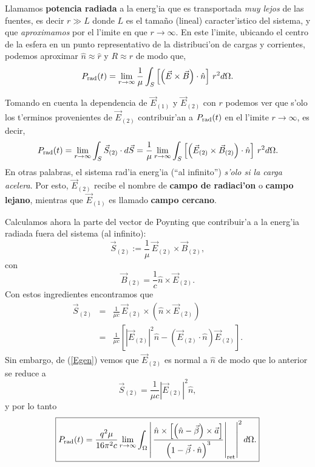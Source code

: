 Llamamos \textbf{potencia radiada} a la energ'ia que es transportada \textit{muy lejos} de las fuentes, es decir $r\gg L$ donde $L$ es el tamaño (lineal) caracter'istico del sistema, y que \textit{aproximamos} por el l'imite en que $r\rightarrow\infty$. En este l'imite, ubicando el centro de la esfera en un punto representativo de la distribuci'on de cargas y corrientes, podemos aproximar $\hat{n}\approx\hat{r}$ y $R\approx r$ de modo que,
\begin{equation}
P_{\rm rad} (t)=\lim_{r\rightarrow\infty}\frac{1}{\mu}\int_S \left[ \left(
\vec{E}\times\vec{B}\right) \cdot \hat{n}\right] \,r^2 d\Omega.
\end{equation}

Tomando en cuenta la dependencia de $\vec{E}_{(1)}$ y $\vec{E}_{(2)}$ con $r$
podemos ver que s'olo los t'erminos provenientes de $\vec{E}_{(2)}$
contribuir'an a $P_{\rm rad}(t)$ en el l'imite $r\rightarrow\infty$, es decir,
\begin{equation}\label{Pinf1}
P_{\rm rad}(t)=\lim_{r\rightarrow\infty}\int_S \vec{S}_{(2)}\cdot
d\vec{S}=\frac{1}{\mu}\lim_{r\rightarrow\infty}\int_S \left[ \left(
\vec{E}_{(2)}\times\vec{B}_{(2)}\right) \cdot \hat{n}\right] \,r^2 d\Omega.
\end{equation}
En otras palabras, el sistema rad'ia energ'ia (``al infinito'') \textit{s'olo si la
carga acelera}. Por esto, $\vec{E}_{(2)}$ recibe el nombre de \textbf{campo de
radiaci'on} o \textbf{campo lejano}, mientras que $\vec{E}_{(1)}$ es llamado
\textbf{campo cercano}.

Calculamos ahora la parte del vector de Poynting que contribuir'a a la energ'ia
radiada fuera del sistema (al infinito):
\begin{equation}
 \vec{S}_{(2)}:=\frac{1}{\mu}\, \vec{E}_{(2)}\times\vec{B}_{(2)},
\end{equation}
con
\begin{equation}
\vec{B}_{(2)}= \frac{1}{c}\hat{n}\times\vec{E}_{(2)}.
\end{equation}
Con estos ingredientes encontramos que
\begin{eqnarray}
 \vec{S}_{(2)}&=&\frac{1}{\mu c}\, \vec{E}_{(2)}\times\left(
\hat{n}\times\vec{E}_{(2)}\right) \\
 &=& \frac{1}{\mu c}\left[ \left|\vec{E}_{(2)}\right|^2 \hat{n}-\left(
\vec{E}_{(2)}\cdot\hat{n}\right)  \vec{E}_{(2)}\right].
\end{eqnarray}
Sin embargo, de (\ref{Egen}) vemos que $\vec{E}_{(2)}$ es normal a $\hat{n}$ de
modo que lo anterior se reduce a
\begin{equation}\label{S2E}
 \boxed{\vec{S}_{(2)}= \frac{1}{\mu c} \left|\vec{E}_{(2)}\right|^2 \hat{n},}
\end{equation}
y por lo tanto
\begin{equation}
 \boxed{P_{\rm rad} (t)=\frac{q^2\mu}{16\pi^2c}\lim_{r\rightarrow\infty}\int_\Omega
\left|\left.\frac{\hat{n}\times\left[ \left( \hat{n}-\vec{\beta}\right)
\times{\vec{a}}\right] }{\left( 1-\vec{\beta}\cdot\hat{n}\right)
^3}\right|_{\rm ret}\right|^2 d\Omega.}
\end{equation}

